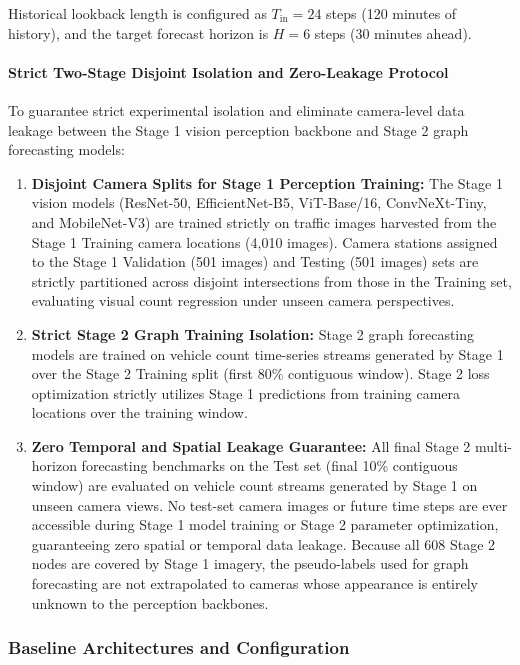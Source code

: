 \documentclass[journal,twocolumn]{IEEEtran}
\begin{document}
Historical lookback length is configured as $T_{\text{in}} = 24$ steps (120 minutes of history), and the target forecast horizon is $H = 6$ steps (30 minutes ahead).

\paragraph{Strict Two-Stage Disjoint Isolation and Zero-Leakage Protocol}
To guarantee strict experimental isolation and eliminate camera-level data leakage between the Stage 1 vision perception backbone and Stage 2 graph forecasting models:
\begin{enumerate}
    \item \textbf{Disjoint Camera Splits for Stage 1 Perception Training:} The Stage 1 vision models (ResNet-50, EfficientNet-B5, ViT-Base/16, ConvNeXt-Tiny, and MobileNet-V3) are trained strictly on traffic images harvested from the Stage 1 Training camera locations (4,010 images). Camera stations assigned to the Stage 1 Validation (501 images) and Testing (501 images) sets are strictly partitioned across disjoint intersections from those in the Training set, evaluating visual count regression under unseen camera perspectives.
    \item \textbf{Strict Stage 2 Graph Training Isolation:} Stage 2 graph forecasting models are trained on vehicle count time-series streams generated by Stage 1 over the Stage 2 Training split (first 80\% contiguous window). Stage 2 loss optimization strictly utilizes Stage 1 predictions from training camera locations over the training window.
    \item \textbf{Zero Temporal and Spatial Leakage Guarantee:} All final Stage 2 multi-horizon forecasting benchmarks on the Test set (final 10\% contiguous window) are evaluated on vehicle count streams generated by Stage 1 on unseen camera views. No test-set camera images or future time steps are ever accessible during Stage 1 model training or Stage 2 parameter optimization, guaranteeing zero spatial or temporal data leakage. Because all 608 Stage 2 nodes are covered by Stage 1 imagery, the pseudo-labels used for graph forecasting are not extrapolated to cameras whose appearance is entirely unknown to the perception backbones.
\end{enumerate}

\label{sec:experiments}

\subsubsection{Baseline Architectures and Configuration}
\label{sec:baselines_config}
\end{document}
